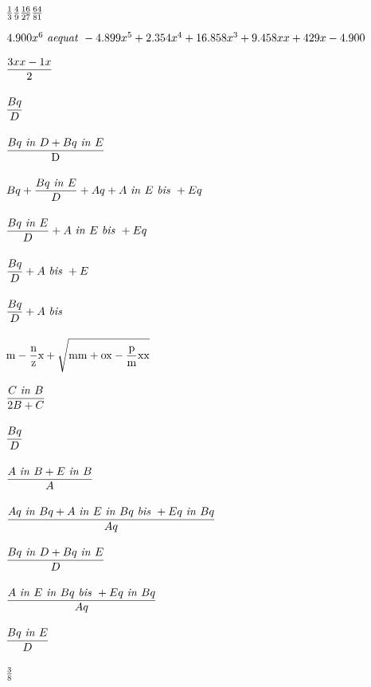 \nopagenumbers
${1\over 3} {4\over 9} {16\over 27} {64\over 81}$\par\vfill\eject
$4.900x^{6} \ {\it aequat}\  - 4.899x^{5} + 2.354x^{4} + 16.858x^{3} + 9.458xx + 429x - 4.900$\par\vfill\eject
${\displaystyle\strut {3xx - 1x}\over \displaystyle\strut 2}$\par\vfill\eject
${\displaystyle\strut Bq\over \displaystyle\strut D}$\par\vfill\eject
${\displaystyle\strut {Bq \ {\it in}\  D + Bq \ {\it in}\  E}\over \displaystyle\strut {\rm D}}$\par\vfill\eject
$Bq + {\displaystyle\strut {Bq \ {\it in}\  E}\over \displaystyle\strut D} + Aq + A \ {\it in}\  E \ {\it bis}\  + Eq$\par\vfill\eject
${\displaystyle\strut {Bq \ {\it in}\  E}\over \displaystyle\strut D} + A \ {\it in}\  E \ {\it bis}\  + Eq$\par\vfill\eject
${\displaystyle\strut Bq\over \displaystyle\strut D} + A \ {\it bis}\  + E$\par\vfill\eject
${\displaystyle\strut Bq\over \displaystyle\strut D} + A \ {\it bis}\ $\par\vfill\eject
${\rm m} - {{\displaystyle\strut {\rm n}\over \displaystyle\strut {\rm z}}}{\rm x} + \sqrt{{\rm mm} + {\rm ox} - {{\displaystyle\strut {\rm p}\over \displaystyle\strut {\rm m}}}{\rm xx}}$\par\vfill\eject
${\displaystyle\strut {C \ {\it in}\  B}\over \displaystyle\strut {2B + C}}$\par\vfill\eject
${\displaystyle\strut Bq\over \displaystyle\strut D}$\par\vfill\eject
${\displaystyle\strut {A \ {\it in}\  B + E \ {\it in}\  B}\over \displaystyle\strut A}$\par\vfill\eject
${\displaystyle\strut {Aq \ {\it in}\  Bq + A \ {\it in}\  E \ {\it in}\  Bq \ {\it bis}\  + Eq \ {\it in}\  Bq}\over \displaystyle\strut Aq}$\par\vfill\eject
${\displaystyle\strut {Bq \ {\it in}\  D + Bq \ {\it in}\  E}\over \displaystyle\strut D}$\par\vfill\eject
${\displaystyle\strut {A \ {\it in}\  E \ {\it in}\  Bq \ {\it bis}\  + Eq \ {\it in}\  Bq}\over \displaystyle\strut Aq}$\par\vfill\eject
${\displaystyle\strut {Bq \ {\it in}\  E}\over \displaystyle\strut D}$\par\vfill\eject
${3\over 8}$\par\vfill\eject
